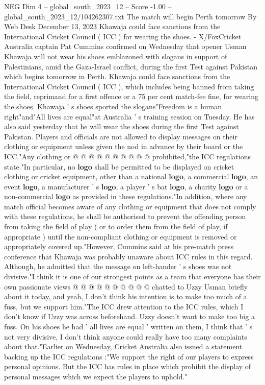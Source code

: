 \begin{textsample}{NEG Dim 4 – global\_south\_2023\_12 – Score -1.00 – global\_south\_2023\_12/104262307.txt}  \label{ex:f4_neg_311}
The match will begin Perth tomorrow By Web Desk December 13, 2023 Khawaja could face sanctions from the International Cricket Council ( ICC ) for wearing the shoes. - X/FoxCricket Australia captain Pat Cummins confirmed on Wednesday that opener Usman Khawaja will not wear his shoes emblazoned with slogans in support of Palestinians, amid the Gaza-Israel conflict, during the first Test against Pakistan which begins tomorrow in Perth.
Khawaja could face sanctions from the International Cricket Council ( ICC ), which includes being banned from taking the field, reprimand for a first offence or a 75 per cent match-fee fine, for wearing the shoes.
Khawaja ' s shoes sported the slogans"Freedom is a human right"and"All lives are equal"at Australia ' s training session on Tuesday.
He has also said yesterday that he will wear the shoes during the first Test against Pakistan.
Players and officials are not allowed to display messages on their clothing or equipment unless given the nod in advance by their board or the ICC."Any clothing or @ @ @ @ @ @ @ @ @ @ prohibited,"the ICC regulations state."In particular, no \textbf{logo} shall be permitted to be displayed on cricket clothing or cricket equipment, other than a national \textbf{logo}, a commercial \textbf{logo}, an event \textbf{logo}, a manufacturer ' s \textbf{logo}, a player ' s bat \textbf{logo}, a charity \textbf{logo} or a non-commercial \textbf{logo} as provided in these regulations."In addition, where any match official becomes aware of any clothing or equipment that does not comply with these regulations, he shall be authorised to prevent the offending person from taking the field of play ( or to order them from the field of play, if appropriate ) until the non-compliant clothing or equipment is removed or appropriately covered up."However, Cummins said at his pre-match press conference that Khawaja was probably unaware about ICC rules in this regard.
Although, he admitted that the message on left-hander ' s shoes was not divisive."I think it is one of our strongest points as a team that everyone has their own passionate views @ @ @ @ @ @ @ @ @ @ chatted to Uzzy Usman briefly about it today, and yeah, I don't think his intention is to make too much of a fuss, but we support him."The ICC drew attention to the ICC rules, which I don't know if Uzzy was across beforehand.
Uzzy doesn't want to make too big a fuss.
On his shoes he had ' all lives are equal ' written on them, I think that ' s not very divisive, I don't think anyone could really have too many complaints about that."Earlier on Wednesday, Cricket Australia also issued a statement backing up the ICC regulations :"We support the right of our players to express personal opinions.
But the ICC has rules in place which prohibit the display of personal messages which we expect the players to uphold."

\end{textsample}
